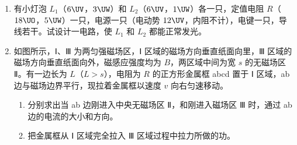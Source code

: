 \documentclass[\gkver]{gaokaozhenti}
\begin{document}
\begin{enumerate}
\item
有小灯泡 $L_{1}$（$6\UV$，$3\UW$）和 $L_{2}$（$6\UV$，$1\UW$）各一只，定值电阻 $R$（$18\UO$，$5\UW$）一只，电源一只（电动势 $12\UV$，内阻不计），电键一只，导线若干。试设计一电路，使 $L_{1}$ 和 $L_{2}$ 都能正常发光。
\onepicture[align=right]{}

\item
如图所示，Ⅰ、Ⅲ 为两匀强磁场区，Ⅰ 区域的磁场方向垂直纸面向里，Ⅲ 区域的磁场方向垂直纸面向外，磁感应强度均为 $B$，两区域中间为宽 $s$ 的无磁场区 Ⅱ。有一边长为 $L$（$L > s$），电阻为 $R$ 的正方形金属框 abcd 置于 Ⅰ 区域，ab 边与磁场边界平行，现拉着金属框以速度 $v$ 向右匀速移动。
\begin{enumerate}
	\item
	分别求出当 ab 边刚进入中央无磁场区 Ⅱ，和刚进入磁场区 Ⅲ 时，通过 ab 边的电流的大小和方向。
	\item
	把金属框从 Ⅰ 区域完全拉入 Ⅲ 区域过程中拉力所做的功。
\end{enumerate}
\onepicture[align=right]{}
\end{enumerate}
\end{document}
